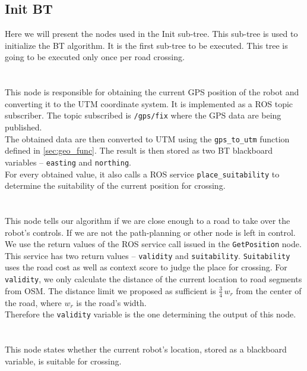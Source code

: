 \subsection{Init BT}
\label{sec:Init-BT-impl}
    Here we will present the nodes used in the Init sub-tree. This sub-tree is used to initialize the BT algorithm. It is the first sub-tree to be executed. This tree is going to be executed only once per road crossing.\\\\
    \\
        This node is responsible for obtaining the current GPS position of the robot and converting it to the UTM coordinate system. It is implemented as a ROS topic subscriber. The topic subscribed is \texttt{/gps/fix} where the GPS data are being published.\\
        The obtained data are then converted to UTM using the \texttt{gps\_to\_utm} function defined in \ref{sec:geo_func}. The result is then stored as two BT blackboard variables -- \texttt{easting} and \texttt{northing}.\\
        For every obtained value, it also calls a ROS service \texttt{place\_suitability} to determine the suitability of the current position for crossing.\\\\
    \\
        This node tells our algorithm if we are close enough to a road to take over the robot's controls. If we are not the path-planning or other node is left in control.\\
        We use the return values of the ROS service call issued in the \texttt{GetPosition} node. This service has two return values -- \texttt{validity} and \texttt{suitability}. \texttt{Suitability} uses the road cost as well as context score to judge the place for crossing. For \texttt{validity}, we only calculate the distance of the current location to road segments from OSM. The distance limit we proposed as sufficient is $\frac{3}{4}\,w_{r}$ from the center of the road, where $w_{r}$ is the road's width.\\
        Therefore the \texttt{validity} variable is the one determining the output of this node.\\\\
    \\
        This node states whether the current robot's location, stored as a blackboard variable, is suitable for crossing.\\
